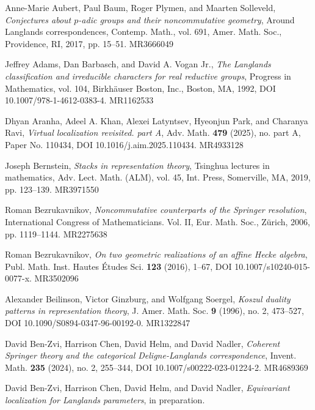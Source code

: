\begin{refs}
\item[{[ABPS17]}] Anne-Marie Aubert, Paul Baum, Roger Plymen, and Maarten Solleveld, \emph{Conjectures about $p$-adic groups and their noncommutative geometry}, Around Langlands correspondences, Contemp. Math., vol. 691, Amer. Math. Soc., Providence, RI, 2017, pp. 15--51. MR3666049
\item[{[ABV92]}] Jeffrey Adams, Dan Barbasch, and David A. Vogan Jr., \emph{The Langlands classification and irreducible characters for real reductive groups}, Progress in Mathematics, vol. 104, Birkh\"auser Boston, Inc., Boston, MA, 1992, DOI 10.1007/978-1-4612-0383-4. MR1162533
\item[{[AKLPR21]}] Dhyan Aranha, Adeel A. Khan, Alexei Latyntsev, Hyeonjun Park, and Charanya Ravi, \emph{Virtual localization revisited. part A}, Adv. Math. \textbf{479} (2025), no. part A, Paper No. 110434, DOI 10.1016/j.aim.2025.110434. MR4933128
\item[{[Ber16]}] Joseph Bernstein, \emph{Stacks in representation theory}, Tsinghua lectures in mathematics, Adv. Lect. Math. (ALM), vol. 45, Int. Press, Somerville, MA, 2019, pp. 123--139. MR3971550
\item[{[Bez06]}] Roman Bezrukavnikov, \emph{Noncommutative counterparts of the Springer resolution}, International Congress of Mathematicians. Vol. II, Eur. Math. Soc., Z\"urich, 2006, pp. 1119--1144. MR2275638
\item[{[Bez16]}] Roman Bezrukavnikov, \emph{On two geometric realizations of an affine Hecke algebra}, Publ. Math. Inst. Hautes \'Etudes Sci. \textbf{123} (2016), 1--67, DOI 10.1007/s10240-015-0077-x. MR3502096
\item[{[BGS96]}] Alexander Beilinson, Victor Ginzburg, and Wolfgang Soergel, \emph{Koszul duality patterns in representation theory}, J. Amer. Math. Soc. \textbf{9} (1996), no. 2, 473--527, DOI 10.1090/S0894-0347-96-00192-0. MR1322847
\item[{[BCHN22]}] David Ben-Zvi, Harrison Chen, David Helm, and David Nadler, \emph{Coherent Springer theory and the categorical Deligne-Langlands correspondence}, Invent. Math. \textbf{235} (2024), no. 2, 255--344, DOI 10.1007/s00222-023-01224-2. MR4689369
\item[{[BCHN]}] David Ben-Zvi, Harrison Chen, David Helm, and David Nadler, \emph{Equivariant localization for Langlands parameters}, in preparation.



\end{refs}
